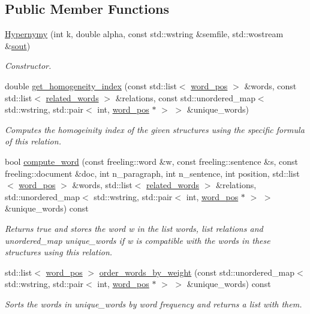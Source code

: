 \subsection*{Public Member Functions}
\begin{DoxyCompactItemize}
\item 
\hyperlink{classHypernymy_a763e43dbe511ef68413683bef8203937}{Hypernymy} (int k, double alpha, const std\+::wstring \&semfile, std\+::wostream \&\hyperlink{classRelation_a44deec0ee05d803ea23e14520fd57a75}{sout})
\begin{DoxyCompactList}\small\item\em Constructor. \end{DoxyCompactList}\item 
double \hyperlink{classHypernymy_a597074abd7795e114d13783677e55e20}{get\+\_\+homogeneity\+\_\+index} (const std\+::list$<$ \hyperlink{structword__pos}{word\+\_\+pos} $>$ \&words, const std\+::list$<$ \hyperlink{structrelated__words}{related\+\_\+words} $>$ \&relations, const std\+::unordered\+\_\+map$<$ std\+::wstring, std\+::pair$<$ int, \hyperlink{structword__pos}{word\+\_\+pos} $\ast$ $>$ $>$ \&unique\+\_\+words)
\begin{DoxyCompactList}\small\item\em Computes the homogeinity index of the given structures using the specific formula of this relation. \end{DoxyCompactList}\item 
bool \hyperlink{classHypernymy_a9eb6e16f7b8128b9865c43df41940a77}{compute\+\_\+word} (const freeling\+::word \&w, const freeling\+::sentence \&s, const freeling\+::document \&doc, int n\+\_\+paragraph, int n\+\_\+sentence, int position, std\+::list$<$ \hyperlink{structword__pos}{word\+\_\+pos} $>$ \&words, std\+::list$<$ \hyperlink{structrelated__words}{related\+\_\+words} $>$ \&relations, std\+::unordered\+\_\+map$<$ std\+::wstring, std\+::pair$<$ int, \hyperlink{structword__pos}{word\+\_\+pos} $\ast$ $>$ $>$ \&unique\+\_\+words) const 
\begin{DoxyCompactList}\small\item\em Returns true and stores the word w in the list words, list relations and unordered\+\_\+map unique\+\_\+words if w is compatible with the words in these structures using this relation. \end{DoxyCompactList}\item 
std\+::list$<$ \hyperlink{structword__pos}{word\+\_\+pos} $>$ \hyperlink{classHypernymy_aaa6ac1db9e77a937d38f6e19c550f62f}{order\+\_\+words\+\_\+by\+\_\+weight} (const std\+::unordered\+\_\+map$<$ std\+::wstring, std\+::pair$<$ int, \hyperlink{structword__pos}{word\+\_\+pos} $\ast$ $>$ $>$ \&unique\+\_\+words) const 
\begin{DoxyCompactList}\small\item\em Sorts the words in unique\+\_\+words by word frequency and returns a list with them. \end{DoxyCompactList}\end{DoxyCompactItemize}

